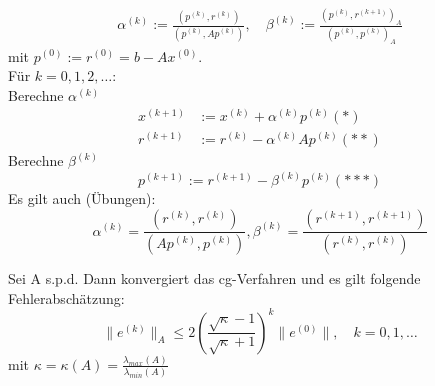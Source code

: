 \begin{algorithmus}
  \begin{align*}
    \alpha^{(k)} := \frac{(p^{(k)},r^{(k)})}{(p^{(k)},Ap^{(k)})},\quad
    \beta^{(k)} := \frac{(p^{(k)},r^{(k+1)})_A}{(p^{(k)},p^{(k)})_A}
  \end{align*}
mit $ p^{(0)}:= r^{(0)}=b-Ax^{(0)}$.\\
Für $k=0,1,2,\ldots $:\\

  Berechne $\alpha^{(k)}$
  \begin{align*}
    x^{(k+1)}&:=x^{(k)}+\alpha^{(k)}p^{(k)} (*)\\
    r^{(k+1)}&:=r^{(k)} -\alpha^{(k)}Ap^{(k)} (**)
  \end{align*}
  Berechne $\beta^{(k)}$
  \[
    p^{(k+1)}:=r^{(k+1)}-\beta^{(k)}p^{(k)} (***)
  \]
  Es gilt auch (Übungen):
  \[
    \alpha^{(k)} = \frac{(r^{(k)},r^{(k)})}{(Ap^{(k)},p^{(k)})}, \beta^{(k)}=\frac{(r^{(k+1)},r^{(k+1)})}{(r^{(k)},r^{(k)})}
  \]
\end{algorithmus}

\begin{satz}[1.3.3]
  Sei A s.p.d. Dann konvergiert das cg-Verfahren und es gilt folgende Fehlerabschätzung:
  \[
    \|e^{(k)}\|_A \leq 2 \left( \frac{\sqrt{\kappa}-1}{\sqrt{\kappa}+1} \right)^k \|e^{(0)}\|, \quad k=0,1,\ldots
  \]
  mit $\kappa = \kappa(A) = \frac{\lambda_{max}(A)}{\lambda_{min}(A)}$
\end{satz}

